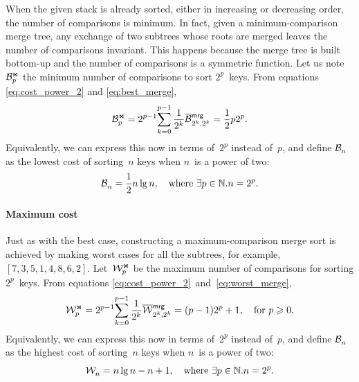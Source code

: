 When the given stack is already sorted, either in increasing or
decreasing order, the number of comparisons is minimum. In fact, given
a minimum\hyp{}comparison merge tree, any
exchange of two subtrees whose roots are merged leaves the number of
comparisons invariant. This happens because the merge tree is built
bottom\hyp{}up and the number of comparisons is a symmetric
function. Let us note \(\mathcal{B}_{p}^{\Join}\) the minimum number of
comparisons to sort \(2^p\)~keys. From equations
\eqref{eq:cost_power_2} and \eqref{eq:best_merge},
\begin{equation*}
\B{\Join}{p}
  = 2^{p-1}\!\sum_{k=0}^{p-1}{\frac{1}{2^k}\OB{\fun{mrg}}{2^k,2^k}}
  = \frac{1}{2}p2^p.
  \index{mrg@$\B{\Join}{n}$}
\end{equation*}
Equivalently, we can express this now in terms of~\(2^p\) instead of~\(p\), and
define \(\mathcal{B}_{n}^{}\) as the lowest cost of sorting~\(n\) keys when \(n\)~is a
power of two:
\begin{equation}
  \mathcal{B}_{n}^{} = \frac{1}{2} n \lg n, \quad \text{where \(\exists p \in
    \mathbb{N}.n=2^p\).}
  \label{eq:best_power}
\end{equation}

\paragraph{Maximum cost}

Just as with the best case, constructing a maximum\hyp{}comparison
merge sort is achieved by making worst cases for all the subtrees, for
example, \([7,3,5,1,4,8,6,2]\). Let~\(\mathcal{W}_{p}^{\Join}\) be the maximum
number of comparisons for sorting \(2^p\)~keys. From equations
\eqref{eq:cost_power_2}~and~\eqref{eq:worst_merge},
\begin{equation*}
\W{\Join}{p}
  = 2^{p-1}\!\sum_{k=0}^{p-1}{\frac{1}{2^k}\OW{\fun{mrg}}{2^k,2^k}}
  = (p-1)2^p + 1, \quad \text{for \(p \geqslant 0\)}.
  \index{mrg@$\W{\Join}{n}$}
\end{equation*}
Equivalently, we can express this now in terms of~\(2^p\) instead of~\(p\), and
define \(\mathcal{B}_{n}^{}\) as the highest cost of sorting~\(n\) keys when \(n\)~is a
power of two:
\begin{equation}
  \mathcal{W}_{n}^{} = n \lg n - n + 1, \quad \text{where \(\exists p \in
    \mathbb{N}.n=2^p\).}
  \label{eq:worst_power}
\end{equation}

